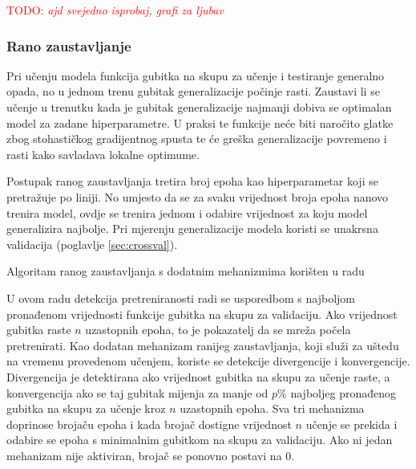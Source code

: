 \documentclass[times, utf8, numeric, diplomski]{fer}
\def\secref#1{(poglavlje \ref{#1})}
\def\TODO#1{\noindent\textcolor{red}{TODO: \textit{#1}}\newline}
\def\todo#1{\TODO{#1}}
\begin{document}
\todo{ajd svejedno isprobaj, grafi za ljubav}
\fi %

\subsubsection{Rano zaustavljanje}
Pri učenju modela funkcija gubitka na skupu za učenje i testiranje generalno opada, no u jednom trenu gubitak generalizacije počinje rasti. Zaustavi li se učenje u trenutku kada je gubitak generalizacije najmanji dobiva se optimalan model za zadane hiperparametre. U praksi te funkcije neće biti naročito glatke zbog stohastičkog gradijentnog spusta te će greška generalizacije povremeno i rasti kako savladava lokalne optimume.

Postupak ranog zaustavljanja tretira broj epoha kao hiperparametar koji se pretražuje po liniji. No umjesto da se za svaku vrijednost broja epoha nanovo trenira model, ovdje se trenira jednom i odabire vrijednost za koju model generalizira najbolje. Pri mjerenju generalizacije modela koristi se unakrsna validacija \secref{sec:crossval}.
\newline
\newline
\begin{algorithm}[H]
\DontPrintSemicolon
{}
\;
\caption{Algoritam ranog zaustavljanja s dodatnim mehanizmima korišten u radu}
\label{alg:nested_cv}
\end{algorithm}

U ovom radu detekcija pretreniranosti radi se usporedbom s najboljom pronađenom vrijednosti funkcije gubitka na skupu za validaciju. Ako vrijednost gubitka raste $n$ uzastopnih epoha, to je pokazatelj da se mreža počela pretrenirati. Kao dodatan mehanizam ranijeg zaustavljanja, koji služi za uštedu na vremenu provedenom učenjem, koriste se detekcije divergencije i konvergencije. Divergencija je detektirana ako vrijednost gubitka na skupu za učenje raste, a konvergencija ako se taj gubitak mijenja za manje od $p\%$ najboljeg pronađenog gubitka na skupu za učenje kroz $n$ uzastopnih epoha. Sva tri mehanizma doprinose brojaču epoha i kada brojač dostigne vrijednost $n$ učenje se prekida i odabire se epoha s minimalnim gubitkom na skupu za validaciju. Ako ni jedan mehanizam nije aktiviran, brojač se ponovno postavi na $0$.
\end{document}
